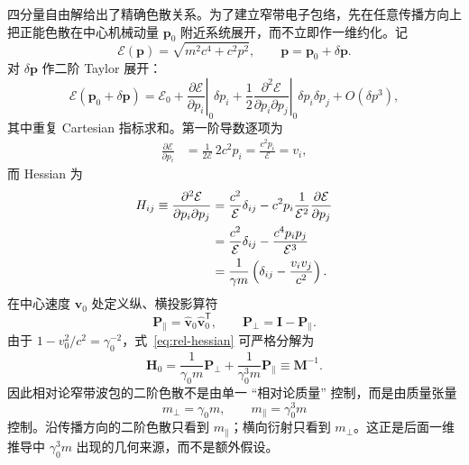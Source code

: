 四分量自由解给出了精确色散关系。为了建立窄带电子包络，先在任意传播方向上把正能色散在中心机械动量 $\bm p_0$ 附近系统展开，而不立即作一维约化。记
\begin{equation}
\mathcal E(\bm p)=\sqrt{m^2c^4+c^2p^2},
\qquad
\bm p=\bm p_0+\delta\bm p.
\end{equation}
对 $\delta\bm p$ 作二阶 Taylor 展开：
\begin{equation}
\mathcal E(\bm p_0+\delta\bm p)
=\mathcal E_0
+\left.\frac{\partial\mathcal E}{\partial p_i}\right|_0\delta p_i
+\frac12\left.\frac{\partial^2\mathcal E}{\partial p_i\partial p_j}\right|_0
\delta p_i\delta p_j
+O(\delta p^3),
\label{eq:E-taylor-vector}
\end{equation}
其中重复 Cartesian 指标求和。第一阶导数逐项为
\begin{align}
\frac{\partial\mathcal E}{\partial p_i}
&=\frac{1}{2\mathcal E}\,2c^2p_i
=\frac{c^2p_i}{\mathcal E}
=v_i,
\label{eq:E-first-derivative}
\end{align}
而 Hessian 为
\begin{align}
H_{ij}
\equiv\frac{\partial^2\mathcal E}{\partial p_i\partial p_j}
&=\frac{c^2}{\mathcal E}\delta_{ij}
-c^2p_i\frac{1}{\mathcal E^2}
\frac{\partial\mathcal E}{\partial p_j}\notag\\
&=\frac{c^2}{\mathcal E}\delta_{ij}
-\frac{c^4p_ip_j}{\mathcal E^3}\notag\\
&=\frac{1}{\gamma m}
\left(\delta_{ij}-\frac{v_iv_j}{c^2}\right).
\label{eq:rel-hessian}
\end{align}
在中心速度 $\bm v_0$ 处定义纵、横投影算符
\begin{equation}
\bm P_\parallel=\hat{\bm v}_0\hat{\bm v}_0^{\mathsf T},
\qquad
\bm P_\perp=\bm I-\bm P_\parallel.
\label{eq:projectors-velocity}
\end{equation}
由于
\(
1-v_0^2/c^2=\gamma_0^{-2}
\)，式~\eqref{eq:rel-hessian} 可严格分解为
\begin{equation}
\boxed{
\bm H_0
=\frac{1}{\gamma_0m}\bm P_\perp
+\frac{1}{\gamma_0^3m}\bm P_\parallel
\equiv\bm M^{-1}.}
\label{eq:mass-tensor-inverse}
\end{equation}
因此相对论窄带波包的二阶色散不是由单一 ``相对论质量'' 控制，而是由质量张量
\begin{equation}
\boxed{
m_\perp=\gamma_0m,
\qquad
m_\parallel=\gamma_0^3m}
\label{eq:transverse-longitudinal-mass}
\end{equation}
控制。沿传播方向的二阶色散只看到 $m_\parallel$；横向衍射只看到 $m_\perp$。这正是后面一维推导中 $\gamma_0^3m$ 出现的几何来源，而不是额外假设。

